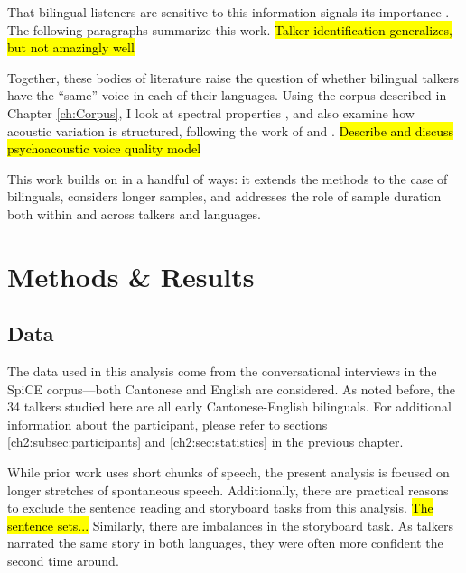 That bilingual listeners are sensitive to this information signals its importance \citep{orena_2019_identifying,fricke_2016_phonetic}. The following paragraphs summarize this work.
\hl{Talker identification generalizes, but not amazingly well} %


Together, these bodies of literature raise the question of whether bilingual talkers have the ``same'' voice in each of their languages. Using the corpus described in Chapter \ref{ch:Corpus}, I look at spectral properties \citep{cheng_2020_f0,altenberg_2006_f0, ryabov_2016_self,ng_2012_ltas}, and also examine how acoustic variation is structured, following the work of \citet{kreiman_2014_theory} and \citet{lee_2019_acoustic}. \hl{Describe and discuss psychoacoustic voice quality model}

This work builds on \citet{lee_2019_acoustic} in a handful of ways: it extends the methods to the case of bilinguals, considers longer samples, and addresses the role of sample duration both within and across talkers and languages. 

\section{Methods \& Results}\label{ch3:sec:methods_results}
\subsection{Data}\label{ch3:sec:data}
The data used in this analysis come from the conversational interviews in the SpiCE corpus---both Cantonese and English are considered. As noted before, the 34 talkers studied here are all early Cantonese-English bilinguals. For additional information about the participant, please refer to sections \ref{ch2:subsec:participants} and \ref{ch2:sec:statistics} in the previous chapter. 

While prior work uses short chunks of speech, the present analysis is focused on longer stretches of spontaneous speech. Additionally, there are practical reasons to exclude the sentence reading and storyboard tasks from this analysis. \hl{The sentence sets...} Similarly, there are imbalances in the storyboard task. As talkers narrated the same story in both languages, they were often more confident the second time around. 

